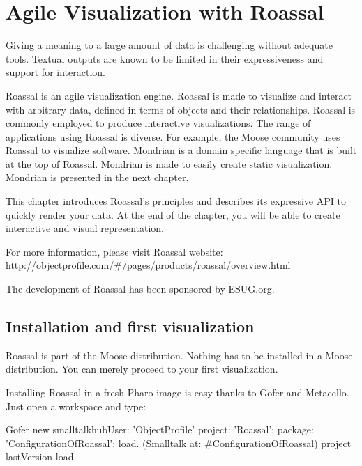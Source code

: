 \documentclass[a4paper,10pt,twoside]{book}
\begin{document}
\fi
\sloppy
\chapter{Agile Visualization with Roassal}



Giving a meaning to a large amount of data is challenging without adequate tools. Textual outputs are known to be limited in their expressiveness and support for interaction. 

Roassal is an agile visualization engine. Roassal is made to visualize and interact with arbitrary data, defined in terms of objects and their relationships. Roassal is commonly employed to produce interactive visualizations. The range of applications using Roassal is diverse. For example, the Moose community uses Roassal to visualize software. 
Mondrian is a domain specific language that is built at the top of Roassal. Mondrian is made to easily create static visualization. Mondrian is presented in the next chapter. 

This chapter introduces Roassal's principles and describes its expressive API to quickly render your data. At the end of the chapter, you will be able to create interactive and visual representation. 

For more information, please visit Roassal website: \\\noindent \url{http://objectprofile.com/\#/pages/products/roassal/overview.html}

The development of Roassal has been sponsored by ESUG.org.

\section{Installation and first visualization}
Roassal is part of the Moose distribution. Nothing has to be installed in a Moose distribution. You can merely proceed to your first visualization.

Installing Roassal in a fresh Pharo image is easy thanks to Gofer and Metacello. Just open a workspace and type:

\begin{code}{}
Gofer new smalltalkhubUser: 'ObjectProfile'
	project: 'Roassal';
	package: 'ConfigurationOfRoassal';
	load.
(Smalltalk at: #ConfigurationOfRoassal) project lastVersion load.
\end{code}
\end{document}
